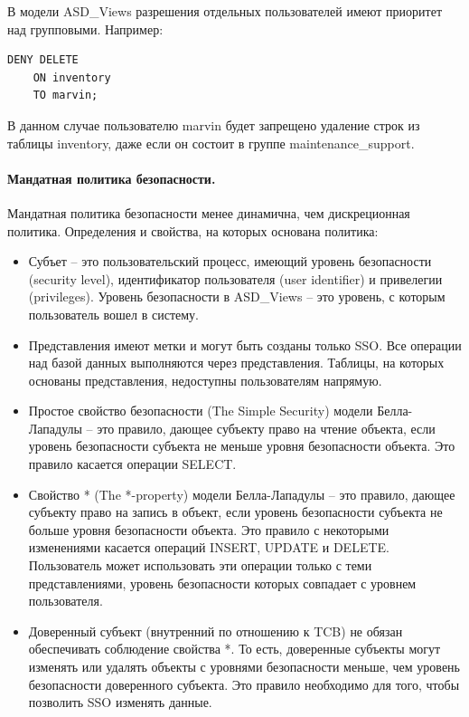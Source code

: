 В модели ASD\_Views разрешения отдельных пользователей имеют приоритет над групповыми. Например:
\begin{lstlisting}[]
    DENY DELETE
    ON inventory
    TO marvin;
\end{lstlisting}
В данном случае пользователю marvin будет запрещено удаление строк из таблицы inventory, 
даже если он состоит в группе maintenance\_support.

\paragraph{Мандатная политика безопасности.}

Мандатная политика безопасности менее динамична, чем дискреционная политика. Определения и свойства, 
на которых основана политика:
\begin{itemize}
    \item Субъет – это пользовательский процесс, имеющий уровень безопасности (security level), 
    идентификатор пользователя (user identifier) и привелегии (privileges). 
    Уровень безопасности в ASD\_Views – это уровень, с которым пользователь вошел в систему.
    \item Представления имеют метки и могут быть созданы только SSO. 
    Все операции над базой данных выполняются через представления. 
    Таблицы, на которых основаны представления, недоступны пользователям напрямую.
    \item Простое свойство безопасности (The Simple Security) модели Белла-Лападулы – это правило, 
    дающее субъекту право на чтение объекта, если уровень безопасности субъекта не меньше уровня безопасности объекта. 
    Это правило касается операции SELECT.
    \item Свойство * (The *-property)  модели Белла-Лападулы – это правило, дающее субъекту право на запись в объект, 
    если уровень безопасности субъекта не больше уровня безопасности объекта. 
    Это правило с некоторыми изменениями касается операций INSERT, UPDATE и DELETE. 
    Пользователь может использовать эти операции только с теми  представлениями, 
    уровень безопасности которых совпадает с уровнем пользователя.
    \item Доверенный субъект (внутренний по отношению к TCB) не обязан обеспечивать соблюдение свойства *. 
    То есть, доверенные субъекты могут изменять или удалять объекты с уровнями безопасности меньше, 
    чем уровень безопасности доверенного субъекта. Это правило необходимо для того, чтобы позволить SSO изменять данные.
\end{itemize}

